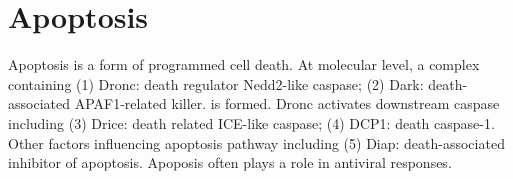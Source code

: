 \documentclass[11pt]{article}
\begin{document}
\begin{sloppypar}
\section*{Apoptosis}
Apoptosis is a form of programmed cell death. 
At molecular level, a complex containing 
\newline
(1) Dronc: death regulator Nedd2-like caspase; \newline
(2) Dark: death-associated APAF1-related killer. \newline
is formed. Dronc activates downstream caspase including 
\newline
(3) Drice: death related ICE-like caspase; \newline
(4) DCP1: death caspase-1. \newline
Other factors influencing apoptosis pathway including 
\newline
(5) Diap: death-associated inhibitor of apoptosis.
Apoposis often plays a role in antiviral responses.
\end{sloppypar}
\end{document}
